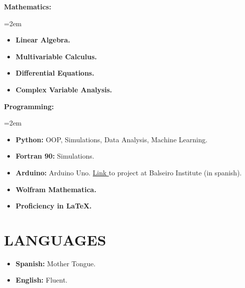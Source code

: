 \documentclass[paper=letter,fontsize=11pt]{scrartcl} %
\newcommand{\sepspace}{\vspace*{1em}}		%
\newcommand{\NewPart}[2]{\section*{\uppercase{#1} \small \normalfont #2}}
\newcommand{\WorkEntry}[5]{
		\noindent \textbf{#1}
        \noindent \small \textit{#2}
        \hfill      %
        \colorbox{White}{%
			\parbox{6em}{%
			\hfill\color{Black}#3}} \par  %
		\noindent \textit{#4} \par        %
		\noindent\hangindent=2em\hangafter=0 \small #5 %
		\normalsize \par}
\newcommand{\Text}[1]{\par       
		\noindent \small #1 
		\normalsize \par}
\begin{document}
\sepspace

\WorkEntry{Mathematics:}{}{}{}{
\begin{itemize}
\item \textbf{Linear Algebra.}
\item \textbf{Multivariable Calculus.}
\item \textbf{Differential Equations.}
\item \textbf{Complex Variable Analysis.} 
\end{itemize}
}


\sepspace

\WorkEntry{Programming:}{}{}{}{
\begin{itemize}
\item \textbf{Python:} OOP, Simulations, Data Analysis, Machine Learning.
\item \textbf{Fortran 90:} Simulations.
\item \textbf{Arduino:} Arduino Uno. {\href{https://drive.google.com/drive/folders/1y01BjDnIPS2QOX3Vo68r9A8HA9tstj1S}{Link }} to project at Balseiro Institute (in spanish).
\item \textbf{Wolfram Mathematica.} 
\item \textbf{Proficiency in LaTeX.}
\end{itemize}
}

\sepspace

\NewPart{LANGUAGES}{}

\begin{itemize}
\item \textbf{Spanish:} Mother Tongue.
\item \textbf{English:} Fluent.
\end{itemize}

\end{document}
